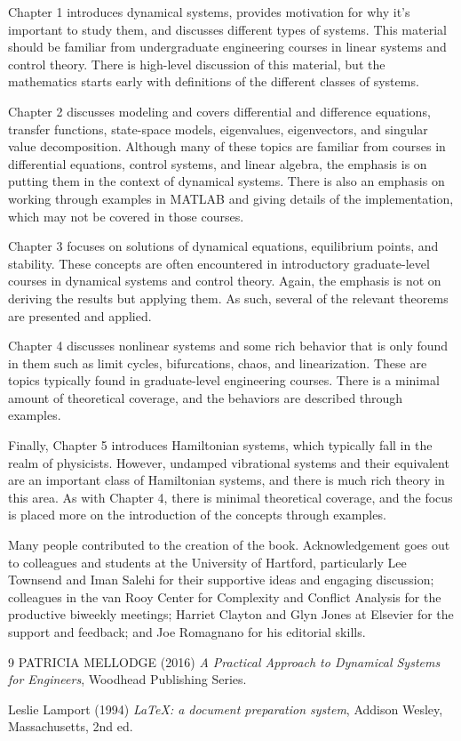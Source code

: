 \documentclass[12pt]{article}
\begin{document}
Chapter 1 introduces dynamical systems, provides motivation for why it’s
important to study them, and discusses different types of systems. This material
should be familiar from undergraduate engineering courses in linear systems and
control theory. There is high-level discussion of this material, but the mathematics
starts early with definitions of the different classes of systems.

Chapter 2 discusses modeling and covers differential and difference
equations, transfer functions, state-space models, eigenvalues, eigenvectors,
and singular value decomposition. Although many of these topics are familiar
from courses in differential equations, control systems, and linear algebra, the
emphasis is on putting them in the context of dynamical systems. There is
also an emphasis on working through examples in MATLAB and giving
details of the implementation, which may not be covered in those courses.

Chapter 3 focuses on solutions of dynamical equations, equilibrium
points, and stability. These concepts are often encountered in introductory
graduate-level courses in dynamical systems and control theory. Again, the
emphasis is not on deriving the results but applying them. As such, several
of the relevant theorems are presented and applied.

Chapter 4 discusses nonlinear systems and some rich behavior that is
only found in them such as limit cycles, bifurcations, chaos, and linearization.
These are topics typically found in graduate-level engineering
courses. There is a minimal amount of theoretical coverage, and the behaviors
are described through examples.


Finally, Chapter 5 introduces Hamiltonian systems, which typically fall
in the realm of physicists. However, undamped vibrational systems and
their equivalent are an important class of Hamiltonian systems, and there is
much rich theory in this area. As with Chapter 4, there is minimal theoretical
coverage, and the focus is placed more on the introduction of the
concepts through examples.

Many people contributed to the creation of the book. Acknowledgement
goes out to colleagues and students at the University of Hartford,
particularly Lee Townsend and Iman Salehi for their supportive ideas and
engaging discussion; colleagues in the van Rooy Center for Complexity
and Conflict Analysis for the productive biweekly meetings; Harriet
Clayton and Glyn Jones at Elsevier for the support and feedback; and Joe
Romagnano for his editorial skills.

\begin{thebibliography}{9}
PATRICIA MELLODGE (2016) \emph{A Practical
Approach to
Dynamical Systems
for Engineers}, Woodhead Publishing Series.

Leslie Lamport (1994) \emph{\LaTeX: a document preparation system}, Addison
Wesley, Massachusetts, 2nd ed.
\end{thebibliography}
\end{document}
